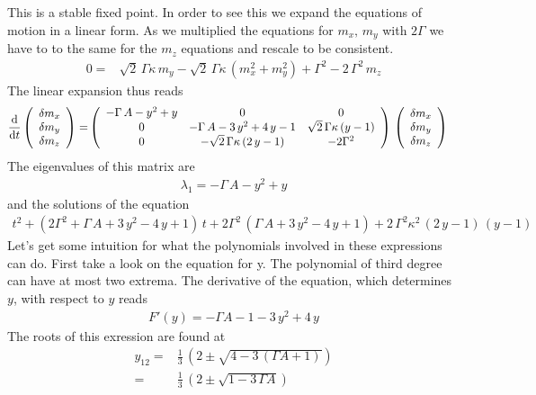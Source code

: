 \documentclass{article}
\begin{document}
This is a stable fixed point. In order to see this we expand the equations of motion in a linear form. As we multiplied the equations for $m_x,\,m_y$ with $2\Gamma$ we have to to the same for the $m_z$ equations and rescale to be consistent. 
\begin{align*}
    0=&\sqrt{2}\,\Gamma\kappa\,m_y  - \sqrt{2}\,\Gamma\kappa\,(m_x^2+ m_y^2)+\Gamma^2-2\,\Gamma^2\,m_z
\end{align*}
The linear expansion thus reads
\begin{align*}
    \frac{\text{d}}{\text{d}t}\left(\begin{array}{c}
         \delta m_x\\
         \delta m_y\\
         \delta m_z
    \end{array}\right)=&\left( \begin{array}{ccc}
        -\Gamma\,A-y^2+y&  0 & 0\\
        0 & -\Gamma\,A-3\,y^2+4\,y-1 & \sqrt{2}\,\Gamma\kappa\,(y-1)\\
        0 &  -\sqrt{2}\,\Gamma\kappa\,(2\,y-1) & -2\Gamma^2
    \end{array} \right)\,\left(\begin{array}{c}
         \delta m_x\\
         \delta m_y\\
         \delta m_z
    \end{array}\right)
\end{align*}
The eigenvalues of this matrix are
\begin{align*}
     \lambda_1=-\Gamma\,A-y^2+y
\end{align*}
and the solutions of the equation
\begin{align*}
    t^2+\left( 2\Gamma^2+\Gamma\,A+3\,y^2-4\,y+1  \right)\,t+2\Gamma^2\,\left( \Gamma\,A+3\,y^2-4\,y+1 \right)+2\,\Gamma^2\kappa^2\,(2\,y-1)\,(y-1)
\end{align*}
Let's get some intuition for what the polynomials involved in these expressions can do. First take a look on the equation for y. The polynomial of third degree can have at most two extrema. The derivative of the equation, which determines $y$, with respect to $y$ reads
\begin{align*}
    F'(y)=-\Gamma A-1 -3\,y^2+4\,y
\end{align*}
The roots of this exression are found at
\begin{align*}
    y_{12}=&\frac{1}{3}\,\left(  2\pm \sqrt{4-3\,(\Gamma A+1)}  \right)\\
    =&\frac{1}{3}\,\left(  2\pm \sqrt{1-3\,\Gamma A}  \right)
\end{align*}
\end{document}
